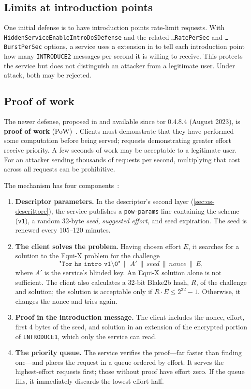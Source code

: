 \subsection{Limits at introduction points}

One initial defense is to have introduction points rate-limit requests. With \texttt{HiddenService\-EnableIntroDoS\-Defense} and the related \texttt{\ldots RatePerSec} and \texttt{\ldots BurstPerSec} options, a service uses a  extension in  to tell each introduction point how many \texttt{INTRODUCE2} messages per second it is willing to receive. This protects the service but does not distinguish an attacker from a legitimate user. Under attack, both may be rejected.

\subsection{Proof of work}

The newer defense, proposed in  and available since tor 0.4.8.4 (August 2023), is \textbf{proof of work} (PoW)~. Clients must demonstrate that they have performed some computation before being served; requests demonstrating greater effort receive priority. A few seconds of work may be acceptable to a legitimate user. For an attacker sending thousands of requests per second, multiplying that cost across all requests can be prohibitive.

The mechanism has four components~:
\begin{enumerate}
  \item \textbf{Descriptor parameters.} In the descriptor's second layer (\cref{sec:os-descrittore}), the service publishes a \texttt{pow-params} line containing the scheme (\texttt{v1}), a random 32-byte \emph{seed}, \emph{suggested effort}, and seed expiration. The seed is renewed every 105--120 minutes.
  \item \textbf{The client solves the problem.} Having chosen effort $E$, it searches for a solution to the Equi-X problem for the challenge
  \[ \texttt{"Tor hs intro v1\textbackslash 0"} \,\|\, A' \,\|\, \mathit{seed} \,\|\, \mathit{nonce} \,\|\, E, \]
  where $A'$ is the service's blinded key. An Equi-X solution alone is not sufficient. The client also calculates a 32-bit Blake2b hash, $R$, of the challenge and solution; the solution is acceptable only if $R \cdot E \le 2^{32} - 1$. Otherwise, it changes the nonce and tries again.
  \item \textbf{Proof in the introduction message.} The client includes the nonce, effort, first 4 bytes of the seed, and solution in an extension of the encrypted portion of \texttt{INTRODUCE1}, which only the service can read.
  \item \textbf{The priority queue.} The service verifies the proof---far faster than finding one---and places the request in a queue ordered by effort. It serves the highest-effort requests first; those without proof have effort zero. If the queue fills, it immediately discards the lowest-effort half.
\end{enumerate}

